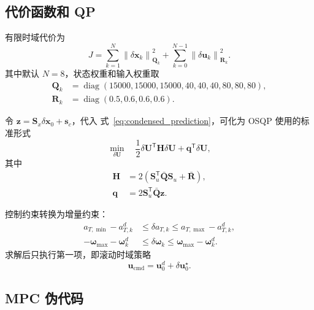 \documentclass[UTF8,a4paper,11pt]{ctexart}
\newcommand{\diag}{\operatorname{diag}}
\newcommand{\normQ}[2]{\left\lVert #1\right\rVert_{#2}^{2}}
\begin{document}
\subsection{代价函数和 QP}

有限时域代价为
\begin{equation}
  J=\sum_{k=1}^{N}\normQ{\delta\bm x_k}{\bm Q_k}
  +\sum_{k=0}^{N-1}\normQ{\delta\bm u_k}{\bm R_k}.
\end{equation}
其中默认 $N=8$，状态权重和输入权重取
\begin{align}
  \bm Q_k&=\diag(15000,15000,15000,40,40,40,80,80,80),\\
  \bm R_k&=\diag(0.5,0.6,0.6,0.6).
\end{align}

令 $\bm z=\bm S_x\delta\bm x_0+\bm s_c$，代入
式~\eqref{eq:condensed_prediction}，可化为 OSQP 使用的标准形式
\begin{equation}
  \min_{\delta\bm U}\quad
  \frac12\delta\bm U^\mathsf T\bm H\delta\bm U
  +\bm q^\mathsf T\delta\bm U,
\end{equation}
其中
\begin{align}
  \bm H&=2(\bm S_u^\mathsf T\bar{\bm Q}\bm S_u+\bar{\bm R}),\\
  \bm q&=2\bm S_u^\mathsf T\bar{\bm Q}\bm z.
\end{align}

控制约束转换为增量约束：
\begin{align}
  a_{T,\min}-a_{T,k}^d
  &\leq \delta a_{T,k}
  \leq a_{T,\max}-a_{T,k}^d,\\
  -\bm\omega_{\max}-\bm\omega_k^d
  &\leq \delta\bm\omega_k
  \leq \bm\omega_{\max}-\bm\omega_k^d.
\end{align}
求解后只执行第一项，即滚动时域策略
\begin{equation}
  \bm u_{\mathrm{cmd}}=\bm u_0^d+\delta\bm u_0^\star.
\end{equation}

\subsection{MPC 伪代码}
\end{document}
